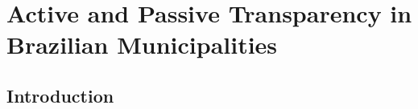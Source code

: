 \documentclass[11pt]{article}
\begin{document}










\section{Active and Passive Transparency in Brazilian Municipalities} \label{sec:paper3}

\subsection{Introduction} \label{subsec:introduction_paper3}
\end{document}
